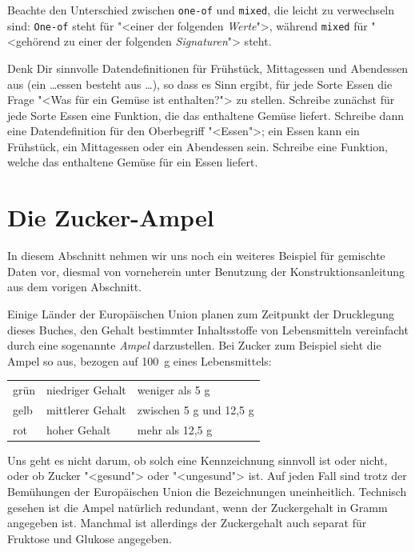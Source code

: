 Beachte den Unterschied zwischen \texttt{one-of} und
\texttt{mixed}, die leicht zu verwechseln sind: \texttt{One-of} steht
für "<einer der folgenden \emph{Werte}">, während \texttt{mixed} für
"<gehörend zu einer der folgenden \emph{Signaturen}"> steht.

\begin{aufgabe}
  Denk Dir sinnvolle Datendefinitionen für Frühstück, Mittagessen und
  Abendessen aus (ein \ldots{}essen besteht aus \ldots), so dass es
  Sinn ergibt, für jede Sorte Essen die Frage "<Was für ein Gemüse ist
  enthalten?"> zu stellen.  Schreibe zunächst für jede Sorte Essen
  eine Funktion, die das enthaltene Gemüse liefert.  Schreibe dann
  eine Datendefinition für den Oberbegriff "<Essen">; ein Essen kann
  ein Frühstück, ein Mittagessen oder ein Abendessen sein.  Schreibe
  eine Funktion, welche das enthaltene Gemüse für ein Essen liefert.
\end{aufgabe}

\section{Die Zucker-Ampel}

In diesem Abschnitt nehmen wir uns noch ein weiteres Beispiel für
gemischte Daten vor, diesmal von vorneherein unter Benutzung der
Konstruktionsanleitung aus dem vorigen Abschnitt.

Einige Länder der Europäischen Union planen zum Zeitpunkt der
Drucklegung dieses Buches, den Gehalt bestimmter Inhaltsstoffe von
Lebensmitteln vereinfacht durch eine sogenannte \textit{Ampel}
darzustellen.  Bei Zucker zum Beispiel sieht die Ampel so aus, bezogen
auf 100~g eines Lebensmittels:
%
\begin{center}
  \begin{tabular}{l|l|l}
    grün & niedriger Gehalt &  weniger als 5 g\\
    gelb & mittlerer Gehalt & zwischen 5 g und 12,5 g\\
    rot & hoher Gehalt & mehr als 12,5 g
  \end{tabular}
\end{center}
%
Uns geht es nicht darum, ob solch eine Kennzeichnung sinnvoll ist oder
nicht, oder ob Zucker "<gesund"> oder "<ungesund"> ist.  Auf jeden
Fall sind trotz der Bemühungen der Europäischen Union die
Bezeichnungen uneinheitlich.  Technisch gesehen ist die Ampel
natürlich redundant, wenn der Zuckergehalt in Gramm angegeben ist.
Manchmal ist allerdings der Zuckergehalt auch separat für Fruktose und
Glukose angegeben.

